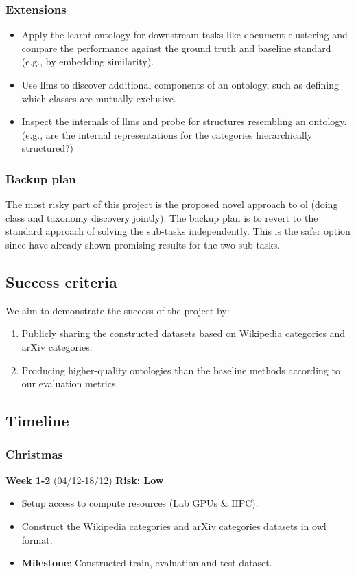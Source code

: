 \subsubsection*{Extensions}
\begin{itemize}
    \item Apply the learnt ontology for downstream tasks like document clustering and compare the performance against the ground truth and baseline standard (e.g., by embedding similarity).
    \item Use \gls{llm}s to discover additional components of an ontology, such as defining which classes are mutually exclusive.
    \item Inspect the internals of \gls{llm}s and probe for structures resembling an ontology. (e.g., are the internal representations for the categories hierarchically structured?)
\end{itemize}

\subsubsection*{Backup plan}
The most risky part of this project is the proposed novel approach to \gls{ol} (doing class and taxonomy discovery jointly). The backup plan is to revert to the standard approach of solving the sub-tasks independently. This is the safer option since \citet{llms4ol} have already shown promising results for the two sub-tasks.

\subsection*{Success criteria}

We aim to demonstrate the success of the project by:
\begin{enumerate}
    \item Publicly sharing the constructed datasets based on Wikipedia categories and arXiv categories.
    \item Producing higher-quality ontologies than the baseline methods according to our evaluation metrics.
\end{enumerate}

\subsection*{Timeline}

\subsubsection*{Christmas}
\textbf{Week 1-2} (04/12-18/12) \hfill \textbf{Risk: Low}
\begin{itemize}
    \item Setup access to compute resources (Lab GPUs \& HPC).
    \item Construct the Wikipedia categories and arXiv categories datasets in \gls{owl} format.
    \item \textbf{Milestone}: Constructed train, evaluation and test dataset.
\end{itemize}

